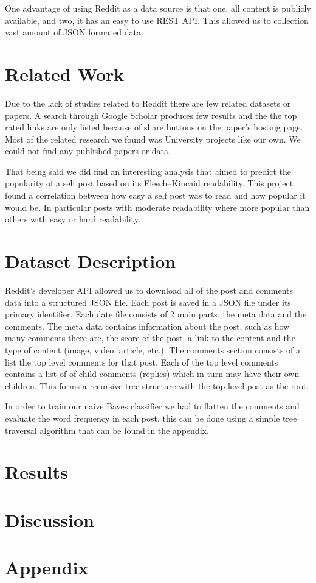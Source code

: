 \documentclass[11pt,twocolumn]{article}
\begin{document}
One advantage of using Reddit as a data source is that one, all content is publicly available, and two, it has an easy to use REST API. This allowed us to collection vast amount of JSON formated data. 

\section{Related Work}
Due to the lack of studies related to Reddit there are few related datasets or papers. A search through Google Scholar produces few results and the the top rated links are only listed because of share buttons on the paper's hosting page. Most of the related research we found was University projects like our own. We could not find any published papers or data.

That being said we did find an interesting analysis that aimed to predict the popularity of a self post based on its Flesch–Kincaid readability. This project found a correlation between how easy a self post was to read and how popular it would be. In particular posts with moderate readability where more popular than others with easy or hard readability.

\section{Dataset Description}

Reddit's developer API allowed us to download all of the post and comments data into a structured JSON file. Each post is saved in a JSON file under its primary identifier. Each date file consists of 2 main parts, the meta data and the comments. The meta data contains information about the post, such as how many comments there are, the score of the post, a link to the content and the type of content (image, video, article, etc.). The comments section consists of a list the top level comments for that post. Each of the top level comments contains a list of of child comments (replies) which in turn may have their own children. This forms a recursive tree structure with the top level post as the root. 

In order to train our naive Bayes classifier we had to flatten the comments and evaluate the word frequency in each post, this can be done using a simple tree traversal algorithm that can be found in the appendix. 

\section{Results}

\section{Discussion}

\section{Appendix}
\end{document}
